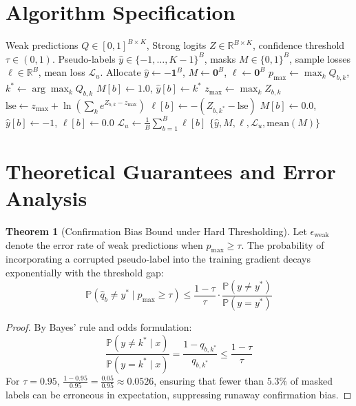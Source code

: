\documentclass[11pt,a4paper]{article}
\theoremstyle{definition}
\newtheorem{theorem}{Theorem}[section]
\begin{document}
\section{Algorithm Specification}

\begin{algorithm}[H]
\caption{FixMatch Confidence-Gated Consistency Loss}
\label{alg:fixmatch}
\begin{algorithmic}[1]
\Require Weak predictions $Q \in [0, 1]^{B \times K}$, Strong logits $Z \in \mathbb{R}^{B \times K}$, confidence threshold $\tau \in (0, 1)$.
\Ensure Pseudo-labels $\hat{y} \in \{-1, \dots, K-1\}^B$, masks $M \in \{0, 1\}^B$, sample losses $\ell \in \mathbb{R}^B$, mean loss $\mathcal{L}_u$.
\State Allocate $\hat{y} \gets -\mathbf{1}^B$, $M \gets \mathbf{0}^B$, $\ell \gets \mathbf{0}^B$
    \State $p_{\text{max}} \gets \max_{k} Q_{b, k}$, $k^* \gets \arg\max_{k} Q_{b, k}$
        \State $M[b] \gets 1.0$, $\hat{y}[b] \gets k^*$
        \State $z_{\text{max}} \gets \max_k Z_{b, k}$
        \State $\text{lse} \gets z_{\text{max}} + \ln \left( \sum_k e^{Z_{b, k} - z_{\text{max}}} \right)$
        \State $\ell[b] \gets -(Z_{b, k^*} - \text{lse})$
    \Else
        \State $M[b] \gets 0.0$, $\hat{y}[b] \gets -1$, $\ell[b] \gets 0.0$
    \EndIf
\EndFor
\State $\mathcal{L}_u \gets \frac{1}{B} \sum_{b=1}^B \ell[b]$
\State \Return $\{\hat{y}, M, \ell, \mathcal{L}_u, \text{mean}(M)\}$
\end{algorithmic}
\end{algorithm}

\section{Theoretical Guarantees and Error Analysis}

\begin{theorem}[Confirmation Bias Bound under Hard Thresholding]
Let $\epsilon_{\text{weak}}$ denote the error rate of weak predictions when $p_{\text{max}} \ge \tau$. The probability of incorporating a corrupted pseudo-label into the training gradient decays exponentially with the threshold gap:
\begin{equation}
\mathbb{P}(\hat{q}_b \ne y^* \mid p_{\text{max}} \ge \tau) \le \frac{1 - \tau}{\tau} \cdot \frac{\mathbb{P}(y \ne y^*)}{\mathbb{P}(y = y^*)}
\end{equation}
\end{theorem}

\begin{proof}
By Bayes' rule and odds formulation:
\begin{equation}
\frac{\mathbb{P}(y \ne k^* \mid x)}{\mathbb{P}(y = k^* \mid x)} = \frac{1 - q_{b, k^*}}{q_{b, k^*}} \le \frac{1 - \tau}{\tau}
\end{equation}
For $\tau = 0.95$, $\frac{1 - 0.95}{0.95} = \frac{0.05}{0.95} \approx 0.0526$, ensuring that fewer than $5.3\%$ of masked labels can be erroneous in expectation, suppressing runaway confirmation bias.
\end{proof}
\end{document}
